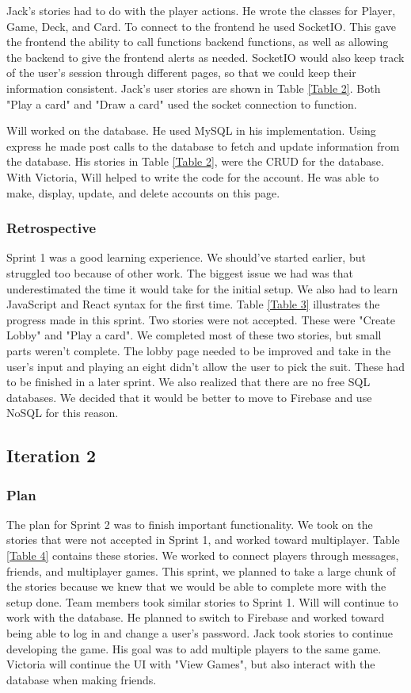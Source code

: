 Jack's stories had to do with the player actions. He wrote the classes for Player, Game, Deck, and Card. To connect to the frontend he used SocketIO. This gave the frontend the ability to call functions backend functions, as well as allowing the backend to give the frontend alerts as needed. SocketIO would also keep track of the user's session through different pages, so that we could keep their information consistent. Jack's user stories are shown in Table \ref{Table 2}. Both "Play a card" and "Draw a card" used the socket connection to function.

Will worked on the database. He used MySQL in his implementation. Using express he made post calls to the database to fetch and update information from the database. His stories in Table \ref{Table 2}, were the CRUD for the database. With Victoria, Will helped to write the code for the account. He was able to make, display, update, and delete accounts on this page.

\subsubsection{Retrospective}
Sprint 1 was a good learning experience. We should’ve started earlier, but struggled too because of other work. The biggest issue we had was that underestimated the time it would take for the initial setup. We also had to learn JavaScript and React syntax for the first time. Table \ref{Table 3} illustrates the progress made in this sprint. Two stories were not accepted. These were "Create Lobby" and "Play a card". We completed most of these two stories, but small parts weren't complete. The lobby page needed to be improved and take in the user's input and playing an eight didn't allow the user to pick the suit. These had to be finished in a later sprint. We also realized that there are no free SQL databases. We decided that it would be better to move to Firebase and use NoSQL for this reason.


\subsection{Iteration 2}

\subsubsection{Plan}
The plan for Sprint 2 was to finish important functionality. We took on the stories that were not accepted in Sprint 1, and worked toward multiplayer. Table \ref{Table 4} contains these stories. We worked to connect players through messages, friends, and multiplayer games. This sprint, we planned to take a large chunk of the stories because we knew that we would be able to complete more with the setup done. Team members took similar stories to Sprint 1. Will will continue to work with the database. He planned to switch to Firebase and worked toward being able to log in and change a user's password. Jack took stories to continue developing the game. His goal was to add multiple players to the same game. Victoria will continue the UI with "View Games", but also interact with the database when making friends.

